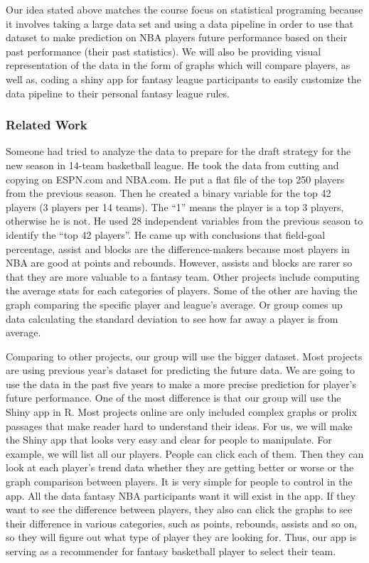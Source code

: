 \documentclass[]{article}
\begin{document}
Our idea stated above matches the course focus on statistical programing
because it involves taking a large data set and using a data pipeline in
order to use that dataset to make prediction on NBA players future
performance based on their past performance (their past statistics). We
will also be providing visual representation of the data in the form of
graphs which will compare players, as well as, coding a shiny app for
fantasy league participants to easily customize the data pipeline to
their personal fantasy league rules.

\subsubsection{Related Work}\label{related-work}

Someone had tried to analyze the data to prepare for the draft strategy
for the new season in 14-team basketball league. He took the data from
cutting and copying on ESPN.com and NBA.com. He put a flat file of the
top 250 players from the previous season. Then he created a binary
variable for the top 42 players (3 players per 14 teams). The ``1''
means the player is a top 3 players, otherwise he is not. He used 28
independent variables from the previous season to identify the ``top 42
players''. He came up with conclusions that field-goal percentage,
assist and blocks are the difference-makers because most players in NBA
are good at points and rebounds. However, assists and blocks are rarer
so that they are more valuable to a fantasy team. Other projects include
computing the average stats for each categories of players. Some of the
other are having the graph comparing the specific player and league's
average. Or group comes up data calculating the standard deviation to
see how far away a player is from average.

Comparing to other projects, our group will use the bigger dataset. Most
projects are using previous year's dataset for predicting the future
data. We are going to use the data in the past five years to make a more
precise prediction for player's future performance. One of the most
difference is that our group will use the Shiny app in R. Most projects
online are only included complex graphs or prolix passages that make
reader hard to understand their ideas. For us, we will make the Shiny
app that looks very easy and clear for people to manipulate. For
example, we will list all our players. People can click each of them.
Then they can look at each player's trend data whether they are getting
better or worse or the graph comparison between players. It is very
simple for people to control in the app. All the data fantasy NBA
participants want it will exist in the app. If they want to see the
difference between players, they also can click the graphs to see their
difference in various categories, such as points, rebounds, assists and
so on, so they will figure out what type of player they are looking for.
Thus, our app is serving as a recommender for fantasy basketball player
to select their team.
\end{document}
